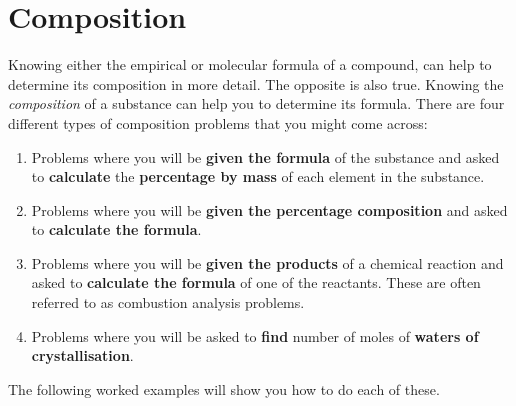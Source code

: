          \section{Composition}
    \nopagebreak
      \label{m38712*id280450}Knowing either the empirical or molecular formula of a compound, can help to determine its composition in more detail. The opposite is also true. Knowing the \textsl{composition} of a substance can help you to determine its formula. There are four different types of composition problems that you might come across:\par 
      \label{m38712*id280463}\begin{enumerate}[noitemsep, label=\textbf{\arabic*}. ] 
            \label{m38712*uid68}\item Problems where you will be \textbf{given the formula} of the substance and asked to \textbf{calculate} the \textbf{percentage by mass} of each element in the substance.
\label{m38712*uid69}\item Problems where you will be \textbf{given the percentage composition} and asked to \textbf{calculate the formula}.
\label{m38712*uid70}\item Problems where you will be \textbf{given the products} of a chemical reaction and asked to \textbf{calculate the formula} of one of the reactants. These are often referred to as combustion analysis problems.
\label{m38712*uid7021}\item Problems where you will be asked to \textbf{find} number of moles of \textbf{waters of crystallisation}.
\end{enumerate}
The following worked examples will show you how to do each of these.
\par
            \label{m38712*secfhsst!!!underscore!!!id901}
      \noindent
